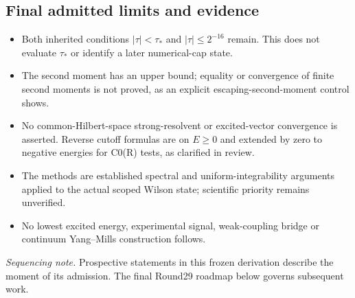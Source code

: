 \subsection*{Final admitted limits and evidence}
\begin{itemize}
\item Both inherited conditions \(|\tau|<\tau_*\) and \(|\tau|\le 2^{-16}\) remain. This does not evaluate \(\tau_*\) or identify a later numerical-cap state.
\item The second moment has an upper bound; equality or convergence of finite second moments is not proved, as an explicit escaping-second-moment control shows.
\item No common-Hilbert-space strong-resolvent or excited-vector convergence is asserted. Reverse cutoff formulas are on \(E\ge 0\) and extended by zero to negative energies for C0(R) tests, as clarified in review.
\item The methods are established spectral and uniform-integrability arguments applied to the actual scoped Wilson state; scientific priority remains unverified.
\item No lowest excited energy, experimental signal, weak-coupling bridge or continuum Yang--Mills construction follows.
\end{itemize}
\par{}\par{}

\emph{Sequencing note.} Prospective statements in this frozen derivation describe the moment of its admission. The final Round29 roadmap below governs subsequent work.
